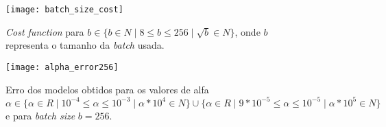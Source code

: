 \begin{figure}[!t]
\centering
\texttt{[image: batch\_size\_cost]}
\caption{\textit{Cost function} para $b \in \{ b \in \!N \mid 8 \leq b \leq 256 \mid \sqrt{b} \in \!N \}$, onde $b$ representa o tamanho da \textit{batch} usada.}
\label{fig:batch_size_cost}
\end{figure}

\begin{figure}[!t]
\centering
\texttt{[image: alpha\_error256]}
\caption{Erro dos modelos obtidos para os valores de alfa $\alpha \in \{ \alpha \in \!R \mid 10^{-4}  \leq \alpha \leq 10^{-3} \mid \alpha * 10^{4} \in \!N \} \cup \{ \alpha \in \!R \mid 9 * 10^{-5}  \leq \alpha \leq 10^{-5} \mid \alpha * 10^{5} \in \!N \}$ e para \textit{batch size} $b = 256$.}
\label{fig:batch_size_error256}
\end{figure}

